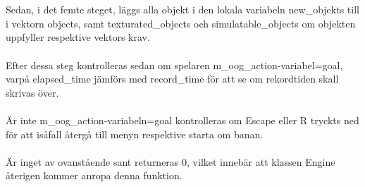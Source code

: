 \documentclass{TDP003mall}
\begin{document}
\\\\
Sedan, i det femte steget, läggs alla objekt i den lokala variabeln new\_objekts till i vektorn objects, samt texturated\_objects och simulatable\_objects om objekten uppfyller respektive vektors krav.
\\\\
Efter dessa steg kontrolleras sedan om spelaren m\_oog\_action-variabel=goal, varpå elapsed\_time jämförs med record\_time för att se om rekordtiden skall skrivas över.
\\\\
Är inte m\_oog\_action-variabeln=goal kontrolleras om Escape eller R tryckts ned för att isåfall återgå till menyn respektive starta om banan.
\\\\
Är inget av ovanstående sant returneras 0, vilket innebär att klassen Engine återigen kommer anropa denna funktion.
\end{document}
